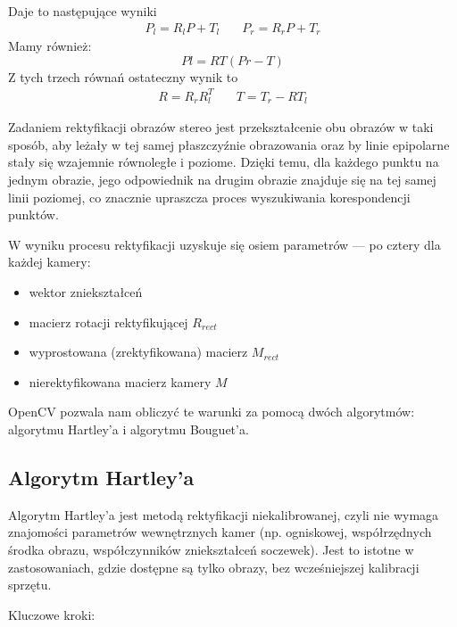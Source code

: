 \documentclass[magisterska]{pracadypl}
\begin{document}
Daje to następujące wyniki
\[
\begin{array}{cc}
P_l = R_l P + T_l & \quad P_r = R_r P + T_r
\end{array}
\]
Mamy również:
\[Pl=RT(Pr-T)\]
Z tych trzech równań ostateczny wynik to
\[
\begin{array}{cc}
R = R_r R_l^T & \quad T = T_r - R T_l
\end{array}
\]

Zadaniem rektyfikacji obrazów stereo jest przekształcenie obu obrazów w taki sposób, aby leżały w tej samej płaszczyźnie obrazowania oraz by linie epipolarne stały się wzajemnie równoległe i poziome. Dzięki temu, dla każdego punktu na jednym obrazie, jego odpowiednik na drugim obrazie znajduje się na tej samej linii poziomej, co znacznie upraszcza proces wyszukiwania korespondencji punktów.

W wyniku procesu rektyfikacji uzyskuje się osiem parametrów — po cztery dla każdej kamery:

\begin{itemize}
  \item wektor zniekształceń
  \item macierz rotacji rektyfikującej $R_{rect}$
  \item wyprostowana (zrektyfikowana) macierz $M_{rect}$
  \item nierektyfikowana macierz kamery $M$
\end{itemize}

OpenCV pozwala nam obliczyć te warunki za pomocą dwóch algorytmów: algorytmu Hartley'a
i algorytmu Bouguet'a.

\subsection{Algorytm Hartley'a}

Algorytm Hartley’a \cite{hartley} jest metodą rektyfikacji niekalibrowanej, czyli nie wymaga znajomości parametrów wewnętrznych kamer (np. ogniskowej, współrzędnych środka obrazu, współczynników zniekształceń soczewek). Jest to istotne w zastosowaniach, gdzie dostępne są tylko obrazy, bez wcześniejszej kalibracji sprzętu.

\bigskip

Kluczowe kroki:
\end{document}
